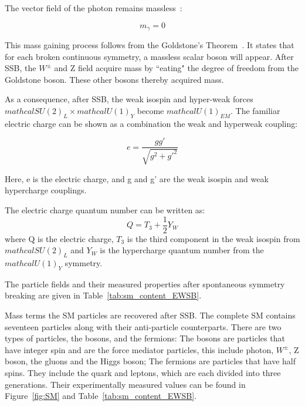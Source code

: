 The vector field of the photon remains massless~\cite{peskin2018introduction}: 

\begin{equation}
    m_{\gamma}=0
\end{equation}


This mass gaining process follows from the Goldstone's Theorem~\cite{PhysRev.117.648}. It states that for each broken continuous symmetry, a massless scalar boson will appear. After SSB, the $W^{\pm}$ and Z field acquire mass by ``eating" the degree of freedom from the Goldstone boson. These other bosons thereby acquired mass. 

As a consequence, after SSB, the weak isospin and hyper-weak forces $mathcal{SU}(2)_{L} \times mathcal{U}(1)_{Y}$ become $mathcal{U}(1)_{EM}$. The familiar electric charge can be shown as a combination the weak and hyperweak coupling:

\begin{equation}
    e= \frac{g g'}{\sqrt{g^{2}+g'^{2}}}
\end{equation}

Here, e is the electric charge, and g and g' are the weak isospin and weak hypercharge couplings. 

The electric charge quantum number can be written as:
\begin{equation}
    Q=T_{3}+\frac{1}{2}Y_{W}
\end{equation}
where Q is the electric charge, $T_{3}$ is the third component in the weak isospin from $mathcal{SU}(2)_{L}$ and $Y_{W}$ is the hypercharge quantum number from the $mathcal{U}(1)_{Y}$ symmetry. 

    

The particle fields and their measured properties after spontaneous symmetry breaking are given in Table~\ref{tab:sm_content_EWSB}.

Mass terms the SM particles are recovered after SSB. The complete SM contains seventeen particles along with their anti-particle counterparts. There are two types of particles, the bosons, and the fermions: The bosons are particles that have integer spin and are the force mediator particles, this include photon, $W^{\pm}$, Z boson, the gluons and the Higgs boson; The fermions are particles that have half spins.
They include the quark and leptons, which are each divided into three generations. Their experimentally measured values can be found in Figure~\ref{fig:SM} and Table~\ref{tab:sm_content_EWSB}.

